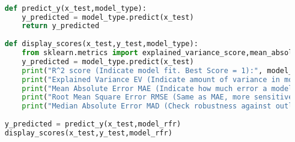 \begin{lstlisting}[language = Python, caption=Model Evaluation]

    def predict_y(x_test,model_type):
        y_predicted = model_type.predict(x_test)
        return y_predicted
    
    def display_scores(x_test,y_test,model_type):
        from sklearn.metrics import explained_variance_score,mean_absolute_error,mean_squared_error,median_absolute_error
        y_predicted = model_type.predict(x_test)
        print("R^2 score (Indicate model fit. Best Score = 1):", model_type.score(x_test,y_test))
        print("Explained Variance EV (Indicate amount of variance in model. Best Score = 1):", explained_variance_score(y_test,y_predicted))
        print("Mean Absolute Error MAE (Indicate how much error a model makes in its prediction. Best Score = 0):", mean_absolute_error(y_test,y_predicted))
        print("Root Mean Square Error RMSE (Same as MAE, more sensitive to outlier. Best Score = 0):", mean_squared_error(y_test,y_predicted))
        print("Median Absolute Error MAD (Check robustness against outlier. Best Score = 1):", median_absolute_error(y_test,y_predicted))
    
    y_predicted = predict_y(x_test,model_rfr)
    display_scores(x_test,y_test,model_rfr)
    
    \end{lstlisting}
